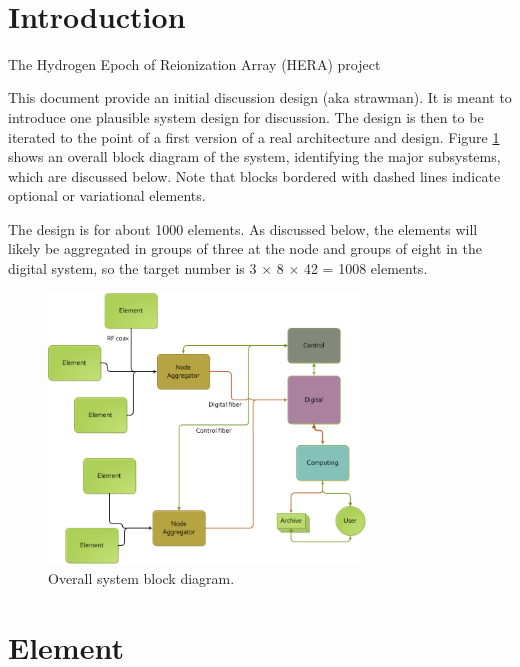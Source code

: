 \documentclass[11pt]{article}
\begin{document}
{ \\}
{
}
\vspace*{0.5cm}


\section{Introduction}

The Hydrogen Epoch of Reionization Array (HERA) project 

This document provide an initial discussion design (aka strawman).  It is meant
to introduce one plausible system design for discussion.  The design is then to
be iterated to the point of a first version of a real architecture and design.
Figure \ref{fig:overall} shows an overall block diagram of the system,
identifying the major subsystems, which are discussed below.  Note that blocks
bordered with dashed lines indicate optional or variational elements.

The design is for about 1000 elements.  As discussed below, the elements will
likely be aggregated in groups of three at the node and groups of eight in the
digital system, so the target number is 3 $\times$ 8 $\times$ 42 = 1008
elements.

\begin{figure}[h]
\centering
\includegraphics[width=0.75\textwidth]{plots/Overall.png}
\caption{Overall system block diagram.}
\label{fig:overall}
\end{figure}

\section{Element}
\end{document}

